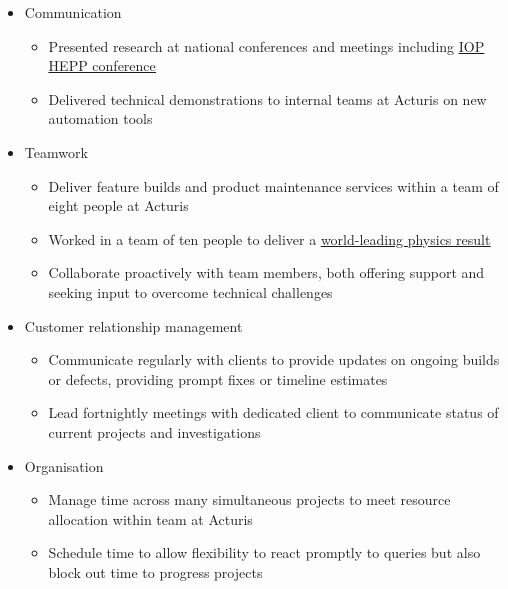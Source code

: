 \documentclass[a4paper]{article}
\newcommand\bodysize{\fontsize{11}{13}}
\newcommand\link[2]{{\color{hl}\uline{\href{#1}{#2}}}}
\newcommand\sidetitle[2][0em]{%
  \fontfamily{phv}\fontseries{b}\fontsize{12}{13}\selectfont\color{hl}
  \hspace{.1em}
  \rotatebox[origin=c]{90}{\hspace{#1}#2}
}
\newcommand\lefttitleblockvpad{\vspace{.3em}}
\newcommand\lefttitleblock[3]{%
  \colorbox{#1}{%
    \begin{minipage}[c]{.04\textwidth}
      \lefttitleblockvpad
      \sidetitle{#2}
      \lefttitleblockvpad
    \end{minipage}{\color{hl}\vrule width 1pt}%
    \begin{minipage}[c]{.005\textwidth}\hfill\end{minipage}
    \begin{minipage}[c]{.94\textwidth}
      \lefttitleblockvpad
      #3
      \lefttitleblockvpad
    \end{minipage}%
  }
}
\begin{document}
\clearpage
\vspace*{-.0em}

\lefttitleblock{bg2}{TRANSFERABLE SKILLS}{%
    \fontseries{m}\fontshape{n}\bodysize\selectfont%
    \begin{itemize}
      \setlength\itemsep{.2em}
      \item Communication
      \begin{itemize}
        \item Presented research at national conferences and meetings including
          \link{https://indico.stfc.ac.uk/event/324/contributions/3215/}{IOP
          HEPP conference}
        \item Delivered technical demonstrations to internal teams at Acturis on new
          automation tools
      \end{itemize}
      \item Teamwork
      \begin{itemize}
        \item Deliver feature builds and product maintenance services within a
          team of eight people at Acturis
        \item Worked in a team of ten people to deliver a
          \link{https://arxiv.org/abs/2305.19142}{world-leading physics result}
        \item Collaborate proactively with team members, both offering support and
          seeking input to overcome technical challenges
      \end{itemize}
      \item Customer relationship management
      \begin{itemize}
        \item Communicate regularly with clients to provide updates on ongoing
          builds or defects, providing prompt fixes or timeline estimates
        \item Lead fortnightly meetings with dedicated client to communicate
          status of current projects and investigations
      \end{itemize}
      \item Organisation
      \begin{itemize}
        \item Manage time across many simultaneous projects to meet
          resource allocation within team at Acturis
        \item Schedule time to allow flexibility to react promptly to queries
          but also block out time to progress projects

\end{itemize}
\end{itemize}}
\end{document}
